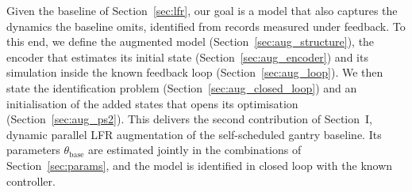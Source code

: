 Given the baseline of Section~\ref{sec:lfr}, our goal is a model that
also captures the dynamics the baseline omits, identified from records
measured under feedback.
To this end, we define the augmented model (Section~\ref{sec:aug_structure}),
the encoder that estimates its initial state (Section~\ref{sec:aug_encoder})
and its simulation inside the known feedback loop
(Section~\ref{sec:aug_loop}).
We then state the identification problem
(Section~\ref{sec:aug_closed_loop}) and an initialisation of the added states
that opens its optimisation (Section~\ref{sec:aug_ps2}).
This delivers the second contribution of Section~I, dynamic parallel LFR
augmentation of the self-scheduled gantry baseline.
Its parameters $\theta_{\mathrm{base}}$ are estimated jointly in the
combinations of Section~\ref{sec:params}, and the model is identified in
closed loop with the known controller.


